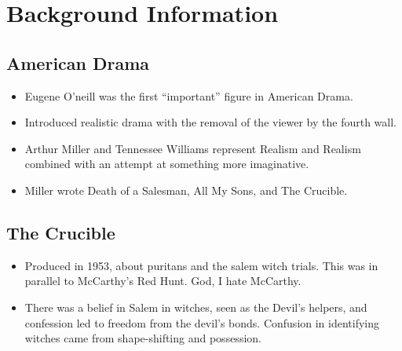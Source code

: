 \documentclass[10pt]{article}
\begin{document}
\section{Background Information}
\subsection{American Drama}
\begin{itemize}
	\item Eugene O'neill was the first ``important'' figure in American Drama.  
	\item Introduced realistic drama with the removal of the viewer by the 
		fourth wall.
	\item Arthur Miller and Tennessee Williams represent Realism and Realism 
		combined 	with an attempt at something more imaginative.
	\item Miller wrote Death of a Salesman, All My Sons, and The Crucible.
\end{itemize}

\subsection{The Crucible}
\begin{itemize}
	\item Produced in 1953, about puritans and the salem witch trials.  
		This was in parallel to McCarthy's Red Hunt.  God, I hate McCarthy.
	\item There was a belief in Salem in witches, seen as the Devil's helpers,
		and	confession led to freedom from the devil's bonds.  Confusion in 
		identifying	witches came from shape-shifting and possession.
\end{itemize}
\end{document}
